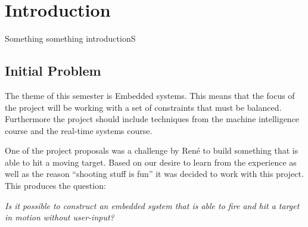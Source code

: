 \chapter{Introduction}
Something something introductionS
\section{Initial Problem}
The theme of this semester is Embedded systems. This means that the focus of
the project will be working with a set of constraints that must be balanced.
Furthermore the project should include techniques from the machine intelligence
course and the real-time systems course.\nl

One of the project proposals was a challenge by Ren\'e to build something that
is able to hit a moving target. Based on our desire to learn from the experience
as well as the reason ``shooting stuff is fun'' it was decided
to work with this project. This produces the question:\nl

\textit{Is it possible to construct an embedded system that is able to fire and hit
a target in motion without user-input?}
